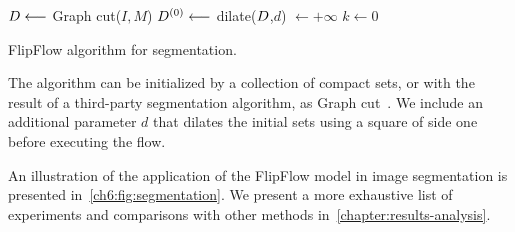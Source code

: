 \begin{algorithm}[]
 
 \BlankLine

 $D \longleftarrow$ Graph cut($I,M$)\;
 $D^{(0)} \longleftarrow $ dilate($D$,$d$)\; 
 \Delta $\longleftarrow +\infty$\;
 $k \longleftarrow 0$\;
 \caption{FlipFlow algorithm for segmentation.}
  \label{ch6:alg:contour-correction} 
\end{algorithm}	

The algorithm can be initialized by a collection of compact sets, or with the result of a third-party segmentation algorithm, as Graph cut~\cite{boykov01graphcut}. We include an additional parameter $d$ that dilates the initial sets using a square of side one before executing the flow.

An illustration of the application of the FlipFlow model in image segmentation is presented in~\cref{ch6:fig:segmentation}. We present a more exhaustive list of experiments and comparisons with other methods in~\cref{chapter:results-analysis}.


